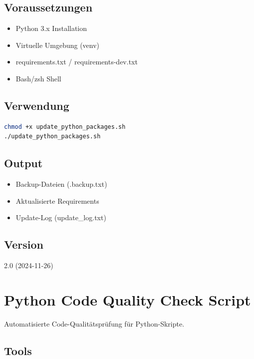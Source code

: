 \documentclass{content/vorlage-design-main}
\begin{document}
\subsection{Voraussetzungen}\label{voraussetzungen-1}

\begin{itemize}

\item
  Python 3.x Installation
\item
  Virtuelle Umgebung (venv)
\item
  requirements.txt / requirements-dev.txt
\item
  Bash/zsh Shell
\end{itemize}

\subsection{Verwendung}\label{verwendung-1}

\begin{lstlisting}[language=bash]
chmod +x update_python_packages.sh
./update_python_packages.sh
\end{lstlisting}

\subsection{Output}\label{output}

\begin{itemize}

\item
  Backup-Dateien (.backup.txt)
\item
  Aktualisierte Requirements
\item
  Update-Log (update\_log.txt)
\end{itemize}

\subsection{Version}\label{version}

2.0 (2024-11-26)

\section{Python Code Quality Check
Script}\label{python-code-quality-check-script}

Automatisierte Code-Qualitätsprüfung für Python-Skripte.

\subsection{Tools}\label{tools-1}
\end{document}
